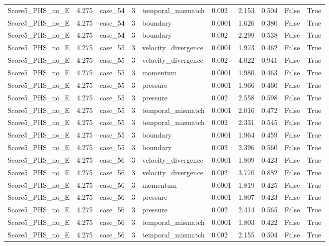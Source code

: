\begin{longtable}{llllllllll}
Score5\_PHS\_no\_E & 4.275 & case\_54 & 3 & temporal\_mismatch & 0.002 & 2.153 & 0.504 & False & True \\
Score5\_PHS\_no\_E & 4.275 & case\_54 & 3 & boundary & 0.0001 & 1.626 & 0.380 & False & True \\
Score5\_PHS\_no\_E & 4.275 & case\_54 & 3 & boundary & 0.002 & 2.299 & 0.538 & False & True \\
Score5\_PHS\_no\_E & 4.275 & case\_55 & 3 & velocity\_divergence & 0.0001 & 1.973 & 0.462 & False & True \\
Score5\_PHS\_no\_E & 4.275 & case\_55 & 3 & velocity\_divergence & 0.002 & 4.022 & 0.941 & False & True \\
Score5\_PHS\_no\_E & 4.275 & case\_55 & 3 & momentum & 0.0001 & 1.980 & 0.463 & False & True \\
Score5\_PHS\_no\_E & 4.275 & case\_55 & 3 & pressure & 0.0001 & 1.966 & 0.460 & False & True \\
Score5\_PHS\_no\_E & 4.275 & case\_55 & 3 & pressure & 0.002 & 2.558 & 0.598 & False & True \\
Score5\_PHS\_no\_E & 4.275 & case\_55 & 3 & temporal\_mismatch & 0.0001 & 2.016 & 0.472 & False & True \\
Score5\_PHS\_no\_E & 4.275 & case\_55 & 3 & temporal\_mismatch & 0.002 & 2.331 & 0.545 & False & True \\
Score5\_PHS\_no\_E & 4.275 & case\_55 & 3 & boundary & 0.0001 & 1.964 & 0.459 & False & True \\
Score5\_PHS\_no\_E & 4.275 & case\_55 & 3 & boundary & 0.002 & 2.396 & 0.560 & False & True \\
Score5\_PHS\_no\_E & 4.275 & case\_56 & 3 & velocity\_divergence & 0.0001 & 1.809 & 0.423 & False & True \\
Score5\_PHS\_no\_E & 4.275 & case\_56 & 3 & velocity\_divergence & 0.002 & 3.770 & 0.882 & False & True \\
Score5\_PHS\_no\_E & 4.275 & case\_56 & 3 & momentum & 0.0001 & 1.819 & 0.425 & False & True \\
Score5\_PHS\_no\_E & 4.275 & case\_56 & 3 & pressure & 0.0001 & 1.807 & 0.423 & False & True \\
Score5\_PHS\_no\_E & 4.275 & case\_56 & 3 & pressure & 0.002 & 2.414 & 0.565 & False & True \\
Score5\_PHS\_no\_E & 4.275 & case\_56 & 3 & temporal\_mismatch & 0.0001 & 1.803 & 0.422 & False & True \\
Score5\_PHS\_no\_E & 4.275 & case\_56 & 3 & temporal\_mismatch & 0.002 & 2.155 & 0.504 & False & True \\

\end{longtable}
